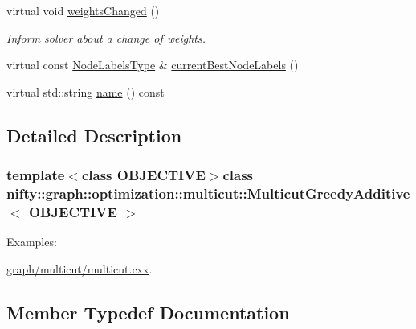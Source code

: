 \begin{DoxyCompactItemize}
\item 
virtual void \hyperlink{classnifty_1_1graph_1_1optimization_1_1multicut_1_1MulticutGreedyAdditive_a1e6f6bd6fc0167c1e700481928a5bba4}{weights\+Changed} ()
\begin{DoxyCompactList}\small\item\em Inform solver about a change of weights. \end{DoxyCompactList}\item 
virtual const \hyperlink{classnifty_1_1graph_1_1optimization_1_1multicut_1_1MulticutGreedyAdditive_aae4ca5190ee50936fc0219aebbe95642}{Node\+Labels\+Type} \& \hyperlink{classnifty_1_1graph_1_1optimization_1_1multicut_1_1MulticutGreedyAdditive_adf396a929cf6006417740c04446ea1a5}{current\+Best\+Node\+Labels} ()
\item 
virtual std\+::string \hyperlink{classnifty_1_1graph_1_1optimization_1_1multicut_1_1MulticutGreedyAdditive_a364d3a771beb86ae2f2c7d9e950955f3}{name} () const 
\end{DoxyCompactItemize}


\subsection{Detailed Description}
\subsubsection*{template$<$class O\+B\+J\+E\+C\+T\+I\+V\+E$>$class nifty\+::graph\+::optimization\+::multicut\+::\+Multicut\+Greedy\+Additive$<$ O\+B\+J\+E\+C\+T\+I\+V\+E $>$}

\begin{Desc}
\item[Examples\+: ]\par
\hyperlink{graph_2multicut_2multicut_8cxx-example}{graph/multicut/multicut.\+cxx}.\end{Desc}


\subsection{Member Typedef Documentation}
\hypertarget{classnifty_1_1graph_1_1optimization_1_1multicut_1_1MulticutGreedyAdditive_a4b7adaf94bc30fa94317f144b9defe18}{}
